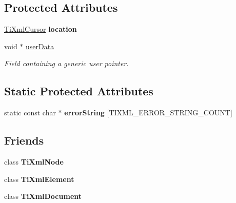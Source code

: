 \subsection*{Protected Attributes}
\begin{DoxyCompactItemize}
\item 
\hypertarget{class_ti_xml_base_a0d992580f3bc264909f898e942677a3c}{\hyperlink{struct_ti_xml_cursor}{Ti\+Xml\+Cursor} {\bfseries location}}\label{class_ti_xml_base_a0d992580f3bc264909f898e942677a3c}

\item 
\hypertarget{class_ti_xml_base_a5278b7f644bf1875a7a9f80c23c188e1}{void $\ast$ \hyperlink{class_ti_xml_base_a5278b7f644bf1875a7a9f80c23c188e1}{user\+Data}}\label{class_ti_xml_base_a5278b7f644bf1875a7a9f80c23c188e1}

\begin{DoxyCompactList}\small\item\em Field containing a generic user pointer. \end{DoxyCompactList}\end{DoxyCompactItemize}
\subsection*{Static Protected Attributes}
\begin{DoxyCompactItemize}
\item 
static const char $\ast$ {\bfseries error\+String} \mbox{[}T\+I\+X\+M\+L\+\_\+\+E\+R\+R\+O\+R\+\_\+\+S\+T\+R\+I\+N\+G\+\_\+\+C\+O\+U\+N\+T\mbox{]}
\end{DoxyCompactItemize}
\subsection*{Friends}
\begin{DoxyCompactItemize}
\item 
\hypertarget{class_ti_xml_base_a375c7dd754867d535eae0d0be8d64225}{class {\bfseries Ti\+Xml\+Node}}\label{class_ti_xml_base_a375c7dd754867d535eae0d0be8d64225}

\item 
\hypertarget{class_ti_xml_base_abf2a39b82921b15ad79b301501e31cd8}{class {\bfseries Ti\+Xml\+Element}}\label{class_ti_xml_base_abf2a39b82921b15ad79b301501e31cd8}

\item 
\hypertarget{class_ti_xml_base_ad0236f45dcd5786504391b84e64745cb}{class {\bfseries Ti\+Xml\+Document}}\label{class_ti_xml_base_ad0236f45dcd5786504391b84e64745cb}

\end{DoxyCompactItemize}


